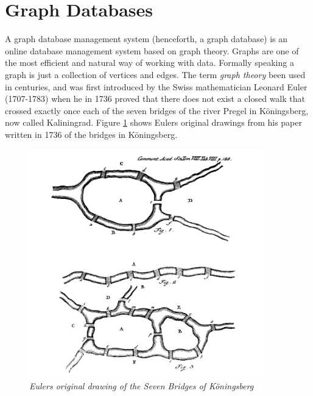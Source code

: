 \section{Graph Databases}
A graph database management system \citep{robinson13} (henceforth, a graph database) is an online database management system %
based on graph theory. Graphs are one of the most efficient and natural way of working with data. Formally speaking a graph is just a collection of vertices and edges. The term \textit{graph theory} been used in centuries, and was first introduced by the Swiss mathematician Leonard Euler (1707-1783) when he in 1736 proved that there does not exist a closed walk that crossed exactly once each of the seven bridges of the river Pregel in Köningsberg, now called Kaliningrad\citep{alexanderson06}. Figure \ref{fig:7bridgesEuler} shows Eulers original drawings from his paper written in 1736 \citep{euler1741} of the bridges in Köningsberg. 

\begin{figure}[H]
  \centering
  \includegraphics[width=4in]{assets/7bridges-euler.png}
  \caption{\textit{Eulers original drawing of the Seven Bridges of Köningsberg}} 
  \label{fig:7bridgesEuler}
\end{figure}

